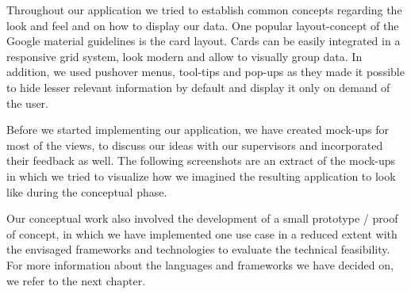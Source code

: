 Throughout our application we tried to establish common concepts regarding the look and feel and on how to display our data. One popular layout-concept of the Google material guidelines is the card layout. Cards can be easily integrated in a responsive grid system, look modern and allow to visually group data. In addition, we used pushover menus, tool-tips and pop-ups as they made it possible to hide lesser relevant information by default and display it only on demand of the user.

Before we started implementing our application, we have created mock-ups for most of the views, to discuss our ideas with our supervisors and incorporated their feedback as well. The following screenshots are an extract of the mock-ups in which we tried to visualize how we imagined the resulting application to look like during the conceptual phase.


Our conceptual work also involved the development of a small prototype / proof of concept, in which we have implemented one use case in a reduced extent with the envisaged frameworks and technologies to evaluate the technical feasibility. For more information about the languages and frameworks we have decided on, we refer to the next chapter.
